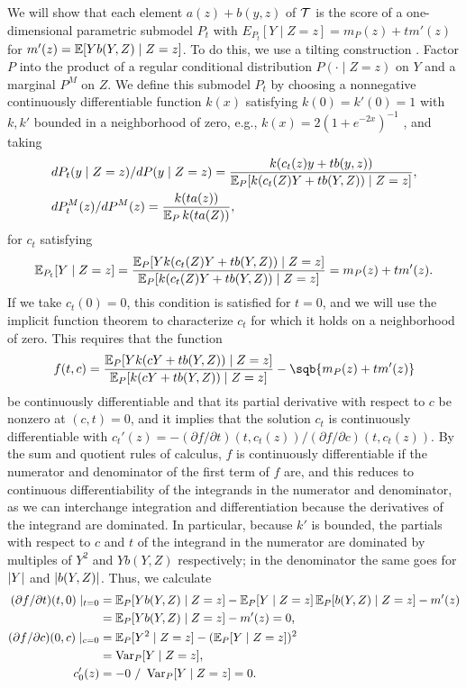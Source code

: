 We will show that each element $a(z)+b(y,z)$ of $\mathcal{T}$ 
is the score of a one-dimensional parametric submodel $P_t$
with $E_{P_t}[Y \mid Z=z] = m_P(z) + t m'(z)$ for $m'(z) = \E[ Y b(Y,Z) \mid Z=z]$.
To do this, we use a tilting construction \citep[see e.g.,][Section 4.5]{tsiatis2007semiparametric}. 
Factor $P$ into the product of a regular conditional distribution $P(\cdot \mid Z=z)$ on $Y$ and a marginal $P^M$ on $Z$.
We define this submodel $P_t$ by  
choosing a nonnegative continuously differentiable function $k(x)$ satisfying $k(0)=k'(0)=1$ with $k,k'$ bounded in a neighborhood of zero, 
e.g., $k(x)=2(1+e^{-2x})^{-1}$ \citep[Example 1.12]{van2000semiparametric},
and taking
\begin{equation}
\label{eq:submodels}
\begin{aligned}
&d\P_t(y \mid Z=z)/d\P(y \mid Z=z) = \frac{k(c_t(z)y + tb(y,z))}{\E_P[ k(c_t(Z)Y + tb(Y,Z)) \mid Z=z]}, \\
&d\P_t^M(z) / d\P^M(z) = \frac{k(ta(z))}{\E_P k(ta(Z))}, 
\end{aligned}
\end{equation}
for $c_t$ satisfying 
\[ \E_{P_t}[Y \mid Z=z] = \frac{\E_P[Y k(c_t(Z)Y + tb(Y,Z)) \mid Z=z]}{\E_P[k(c_t(Z)Y + tb(Y,Z)) \mid Z=z]} = m_P(z) + tm'(z). \] 
If we take $c_t(0)=0$, this condition is satisfied for $t=0$, and we will use the implicit function theorem 
to characterize $c_t$ for which it holds on a neighborhood of zero. This requires that the function 
\[ f(t,c) = \frac{\E_P[Y k(cY + tb(Y,Z)) \mid Z=z]}{\E_P[k(c Y + tb(Y,Z)) \mid Z=z]} - \sqb{m_P(z) + tm'(z)} \]
be continuously differentiable and that its partial derivative with respect to $c$ be nonzero at $(c,t)=0$,
and it implies that the solution $c_t$ is continuously differentiable with 
$c_t'(z) = -(\partial f/\partial t)(t, c_t(z)) / (\partial f/\partial c)(t, c_t(z))$.
By the sum and quotient rules of calculus, $f$ is continuously differentiable if the numerator and denominator of
the first term of $f$ are, and this reduces to continuous differentiability of the integrands in the numerator and denominator, 
as we can interchange integration and differentiation because the derivatives of the integrand are dominated.
In particular, because $k'$ is bounded, the partials with respect to $c$ and $t$ 
of the integrand in the numerator are dominated by multiples of $Y^2$ and $Yb(Y,Z)$ respectively;
in the denominator the same goes for $\lvert Y\rvert$ and $\lvert b(Y,Z)\rvert$. Thus, we calculate
\begin{align*} 
(\partial f/\partial t)(t,0) \mid_{t=0} &= \E_P[Yb(Y,Z) \mid Z=z] - \E_P[Y \mid Z=z]\E_P[b(Y,Z) \mid Z=z] - m'(z) \\
                                        &= \E_P[Yb(Y,Z) \mid Z=z] - m'(z) = 0, \\
(\partial f/\partial c)(0,c) \mid_{c=0} &= \E_P[Y^2 \mid Z=z] - (\E_P[Y \mid Z=z])^2 \\
                                        &= \var_P[Y \mid Z=z], \\
c_0'(z) &= -0 \ /\ \var_P[Y \mid Z=z] = 0.
\end{align*}
